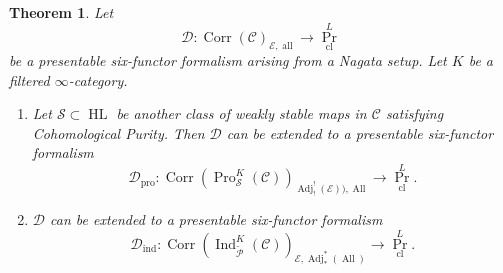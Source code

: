 \documentclass[14pt]{article}
\newtheorem{theorem}{Theorem}[subsection]
\theoremstyle{definition}
\newcommand{\E}{\mathcal{E}}
\newcommand{\D}{\mathcal{D}}
\renewcommand{\P}{\mathcal{P}}
\newcommand{\op}[1]{\operatorname{#1}}
\renewcommand{\S}{\mathcal{S}}
\newcommand{\Ca}{\mathcal{C}}
\numberwithin{subsection}{section}
\begin{document}
\begin{theorem}\label{theorem:IndProextensions}
 Let 
   \begin{equation}
       \D: \op{Corr}(\Ca)_{\E,\op{all}} \to \op{Pr}^L_{\op{cl}}
   \end{equation}
   be a presentable six-functor formalism  arising from a Nagata setup. Let $K$ be a filtered $\infty$-category.
   \begin{enumerate}
    
   \item  Let $\S \subset {\op{HL}}$ be another class of weakly stable maps in $\Ca$ satisfying Cohomological Purity. Then $\D$ can be extended to a presentable six-functor formalism
   \begin{equation}
       \D_{\op{pro}} : \op{Corr}(\op{Pro}^K_{\S}(\Ca))_{\op{Adj}^!_!(\E)),\op{All}} \to \op{Pr}^L_{\op{cl}}.
   \end{equation}
  \item  $\D$ can be extended to a presentable six-functor formalism
   \begin{equation}
       \D_{\op{ind}}: \op{Corr}(\op{Ind}^K_{\tilde{\P}}(\Ca))_{\E,\op{Adj}^*_*(\op{All})} \to \op{Pr}^L_{\op{cl}}.
   \end{equation}
   
\end{enumerate}
  
\end{theorem}
\end{document}

